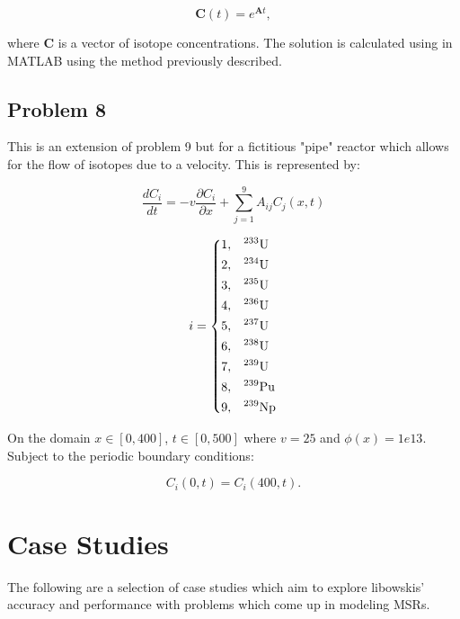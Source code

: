 \begin{equation}
   \boldsymbol{C}(t) = e^{\boldsymbol{A}t}, 
\end{equation}

\noindent where $\boldsymbol{C}$ is a vector of isotope concentrations. The solution is calculated using in MATLAB using the method previously described. 


\subsection{Problem 8}
This is an extension of problem 9 but for a fictitious "pipe" reactor which allows for the flow of isotopes due to a velocity. This is represented by:

\begin{equation}
\frac{d C_i}{dt} = -v\frac{\partial C_{i}}{\partial x} + \sum^9_{j = 1} A_{ij} C_j (x, t)
\end{equation}

\begin{equation}
i = \begin{dcases}
  1 , & \text{$^{233}$U}  \\
  2 , & \text{$^{234}$U}  \\
  3 , & \text{$^{235}$U}  \\
  4 , & \text{$^{236}$U}  \\
  5 , & \text{$^{237}$U}  \\
  6 , & \text{$^{238}$U}  \\
  7 , & \text{$^{239}$U}  \\
  8 , & \text{$^{239}$Pu} \\
  9 , & \text{$^{239}$Np} \\
\end{dcases}
\end{equation}

\noindent On the domain $x \in [0, 400]$, $t \in [0, 500]$ where $v = 25$ and $\phi(x) = 1e13$. Subject to the periodic boundary conditions:

\begin{equation}
    C_{i}(0,t) = C_{i}(400,t).
\end{equation}

\section{Case Studies}
The following are a selection of case studies which aim to explore libowskis' accuracy and performance with problems which come up in modeling MSRs. 

